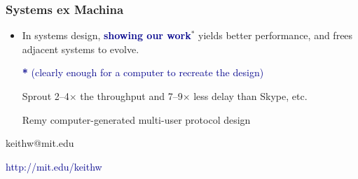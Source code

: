 \documentclass[svgnames]{beamer}
\begin{document}

\begin{frame}

\frametitle{Systems ex Machina}

\begin{itemize}

\item In systems design, \textbf{\textcolor{DarkBlue}{showing our
    work}$^{*}$} yields better performance, and frees adjacent systems
to evolve.

\item[] \textcolor{DarkBlue}{\textbf{*} (clearly enough for a computer to recreate the design)}

\item[]

\item[Sprout] 2--4$\times$ the throughput and 7--9$\times$ less delay than Skype, etc.

\item[Remy] computer-generated multi-user protocol design



\end{itemize}

\vspace{\baselineskip}

\begin{centering}
keithw@mit.edu

\vspace{7 pt}

\textcolor{DarkBlue}{http://mit.edu/keithw}

\end{centering}

\end{frame}
\end{document}
